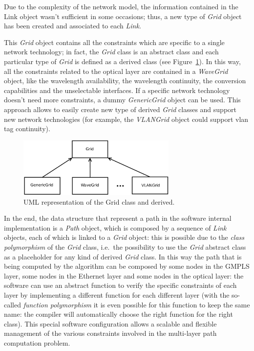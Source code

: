 \documentclass[10pt,a4paper]{report}
\begin{document}
Due to the complexity of the network model, the information contained
in the Link object wasn't sufficient in some occasions; thus, a new
type of \textit{Grid} object has been created and associated to each
\textit{Link}.

This \textit{Grid} object contains all the constraints which are
specific to a single network technology; in fact, the \textit{Grid}
class is an abstract class and each particular type of \textit{Grid}
is defined as a derived class (see Figure~\ref{fig:grid_uml}). In this
way, all the constraints related to the optical layer are contained in
a \textit{WaveGrid} object, like the wavelength availability, the
wavelength continuity, the conversion capabilities and the
unselectable interfaces. If a specific network technology doesn't need
more constraints, a dummy \textit{GenericGrid} object can be
used. This approach allows to easily create new type of derived
\textit{Grid} classes and support new network technologies (for
example, the \textit{VLANGrid} object could support vlan tag
continuity).

\begin{figure}[!htbp]
  \begin{center}
    \includegraphics[width=0.7\textwidth]{img/grid_uml}
    \caption[Grid UML Diagram]{UML representation of the Grid class
      and derived.}
    \label{fig:grid_uml}
  \end{center}
\end{figure}

In the end, the data structure that represent a path in the software
internal implementation is a \textit{Path} object, which is composed
by a sequence of \textit{Link} objects, each of which is linked to a
\textit{Grid} object: this is possible due to the \textit{class
  polymorphism} of the \textit{Grid} class, i.e.\ the possibility to
use the \textit{Grid} abstract class as a placeholder for any kind of
derived \textit{Grid} class. In this way the path that is being
computed by the algorithm can be composed by some nodes in the GMPLS
layer, some nodes in the Ethernet layer and some nodes in the optical
layer: the software can use an abstract function to verify the
specific constraints of each layer by implementing a different
function for each different layer (with the so-called \textit{function
  polymorphism} it is even possible for this function to keep the same
name: the compiler will automatically choose the right function for
the right class). This special software configuration allows a
scalable and flexible management of the various constraints involved
in the multi-layer path computation problem.
\end{document}
